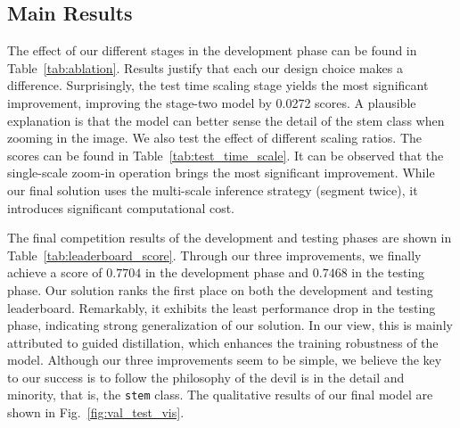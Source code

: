 \subsection{Main Results}
The effect of our different stages in the development phase can
be found in Table~\ref{tab:ablation}. %
Results justify that each our design choice makes a difference. Surprisingly, the test time scaling stage yields the most significant improvement, improving the stage-two model by 0.0272 scores. A plausible explanation is that the model can better sense the detail of the stem class when zooming in the image. %
We also test the effect of different scaling ratios. The scores can be found in Table~\ref{tab:test_time_scale}. It can be observed that the single-scale zoom-in operation brings the most significant improvement. While our final solution uses the multi-scale inference strategy (segment twice), it introduces significant computational cost. 

The final competition results of the development and testing phases are shown in Table~\ref{tab:leaderboard_score}. Through our three improvements, we finally achieve a score of $0.7704$ in the development phase and $0.7468$ in the testing phase. Our solution ranks the first place on both the development and testing leaderboard. Remarkably, it exhibits the least performance drop in the testing phase, indicating strong generalization of our solution. %
In our view, this is mainly attributed to guided distillation, which enhances the training robustness of the model. Although our three improvements seem to be simple, we believe the key to our success is to follow the philosophy of the devil is in the detail and minority, that is, the \texttt{stem} class. The qualitative results of our final model are shown in Fig.~\ref{fig:val_test_vis}. %


